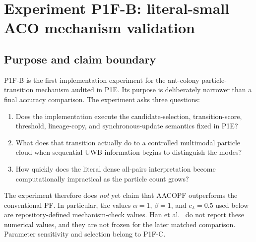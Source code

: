 \section{Experiment P1F-B: literal-small ACO mechanism validation}
\subsection{Purpose and claim boundary}
P1F-B is the first implementation experiment for the ant-colony particle-transition mechanism audited in P1E. Its purpose is deliberately narrower than a final accuracy comparison. The experiment asks three questions:
\begin{enumerate}
    \item Does the implementation execute the candidate-selection, transition-score, threshold, lineage-copy, and synchronous-update semantics fixed in P1E?
    \item What does that transition actually do to a controlled multimodal particle cloud when sequential UWB information begins to distinguish the modes?
    \item How quickly does the literal dense all-pairs interpretation become computationally impractical as the particle count grows?
\end{enumerate}

The experiment therefore does \emph{not} yet claim that AACOPF outperforms the conventional PF. In particular, the values $\alpha=1$, $\beta=1$, and $c_\lambda=0.5$ used below are repository-defined mechanism-check values. Han et al.~\cite{han2020cooperative} do not report these numerical values, and they are not frozen for the later matched comparison. Parameter sensitivity and selection belong to P1F-C.

